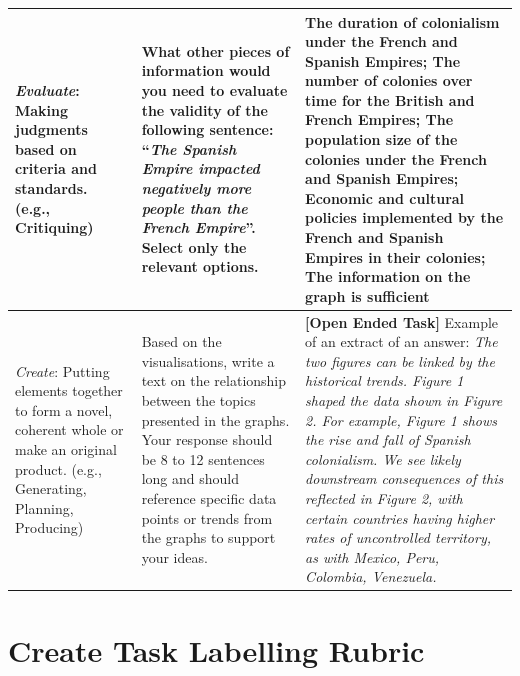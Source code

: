 \begin{table}[h!]
\begin{tabular}{p{3.4cm}p{4.4cm}p{6.5cm}}
\midrule
\textit{Evaluate}: Making judgments based on criteria and standards. (e.g., Critiquing) & What other pieces of information would you need to evaluate the validity of the following sentence: ``\textit{The Spanish Empire impacted negatively more people than the French Empire}''. Select only the relevant options. & The duration of colonialism under the French and Spanish Empires; The number of colonies over time for the British and French Empires; \textbf{The population size of the colonies under the French and Spanish Empires}; \textbf{Economic and cultural policies implemented by the French and Spanish Empires in their colonies}; The information on the graph is sufficient \\  \midrule
\textit{Create}: Putting elements together to form a novel, coherent whole or make an original product. (e.g., Generating, Planning, Producing) & Based on the visualisations, write a text on the relationship between the topics presented in the graphs. Your response should be 8 to 12 sentences long and should reference specific data points or trends from the graphs to support your ideas. & \textbf{[Open Ended Task]} Example of an extract of an answer:      \textit{The two figures can be linked by the historical trends.  Figure 1 shaped the data shown in Figure 2. For example, Figure 1 shows the rise and fall of Spanish colonialism. We see likely downstream consequences of this reflected in Figure 2, with certain countries having higher rates of uncontrolled territory, as with Mexico, Peru, Colombia, Venezuela.} \\
\bottomrule
\end{tabular}
\label{tab:question_table}
\end{table}

\newpage
\section{Create Task Labelling Rubric}
\label{sec:appendix-create-rubric}

